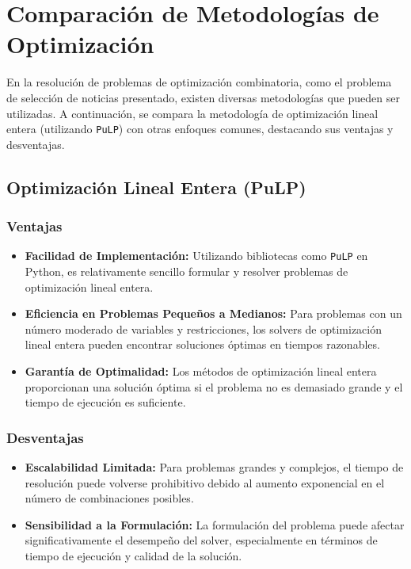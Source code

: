 \documentclass{article}
\begin{document}
\section*{Comparación de Metodologías de Optimización}

En la resolución de problemas de optimización combinatoria, como el problema de selección de noticias presentado, existen diversas metodologías que pueden ser utilizadas. A continuación, se compara la metodología de optimización lineal entera (utilizando \texttt{PuLP}) con otras enfoques comunes, destacando sus ventajas y desventajas.

\subsection*{Optimización Lineal Entera (PuLP)}

\subsubsection*{Ventajas}
\begin{itemize}
    \item \textbf{Facilidad de Implementación:} Utilizando bibliotecas como \texttt{PuLP} en Python, es relativamente sencillo formular y resolver problemas de optimización lineal entera.
    \item \textbf{Eficiencia en Problemas Pequeños a Medianos:} Para problemas con un número moderado de variables y restricciones, los solvers de optimización lineal entera pueden encontrar soluciones óptimas en tiempos razonables.
    \item \textbf{Garantía de Optimalidad:} Los métodos de optimización lineal entera proporcionan una solución óptima si el problema no es demasiado grande y el tiempo de ejecución es suficiente.
\end{itemize}

\subsubsection*{Desventajas}
\begin{itemize}
    \item \textbf{Escalabilidad Limitada:} Para problemas grandes y complejos, el tiempo de resolución puede volverse prohibitivo debido al aumento exponencial en el número de combinaciones posibles.
    \item \textbf{Sensibilidad a la Formulación:} La formulación del problema puede afectar significativamente el desempeño del solver, especialmente en términos de tiempo de ejecución y calidad de la solución.
\end{itemize}
\end{document}
